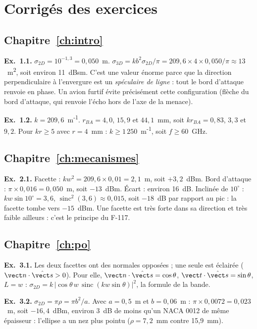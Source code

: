 \chapter{Corrigés des exercices}\label{annexe:corriges}

\section*{Chapitre~\ref{ch:intro}}
\textbf{Ex.~1.1.} $\sigma_{2D}=10^{-1{,}3}=0{,}050$~m. $\sigma_{3D}=kb^2\sigma_{2D}/\pi=209{,}6\times4\times0{,}050/\pi\approx13$~m\textsuperscript{2}, soit environ 11~dBsm. C'est une valeur énorme parce que la direction perpendiculaire à l'envergure est un \emph{spéculaire de ligne} : tout le bord d'attaque renvoie en phase. Un avion furtif évite précisément cette configuration (flèche du bord d'attaque, qui renvoie l'écho hors de l'axe de la menace).

\textbf{Ex.~1.2.} $k=209{,}6$~m\textsuperscript{-1}. $r_{BA}=4{,}0$, $15{,}9$ et $44{,}1$~mm, soit $kr_{BA}=0{,}83$, $3{,}3$ et $9{,}2$. Pour $kr\ge5$ avec $r=4$~mm : $k\ge1\,250$~m\textsuperscript{-1}, soit $f\ge60$~GHz.

\section*{Chapitre~\ref{ch:mecanismes}}
\textbf{Ex.~2.1.} Facette : $kw^2=209{,}6\times0{,}01=2{,}1$~m, soit $+3{,}2$~dBm. Bord d'attaque : $\pi\times0{,}016=0{,}050$~m, soit $-13$~dBm. Écart : environ 16~dB. Inclinée de $10^\circ$ : $kw\sin10^\circ=3{,}6$, $\operatorname{sinc}^2(3{,}6)\approx0{,}015$, soit $-18$~dB par rapport au pic : la facette tombe vers $-15$~dBm. Une facette est très forte dans sa direction et très faible ailleurs : c'est le principe du F-117.

\section*{Chapitre~\ref{ch:po}}
\textbf{Ex.~3.1.} Les deux facettes ont des normales opposées ; une seule est éclairée ($\vect n\cdot\shat>0$). Pour elle, $\vect n\cdot\shat=\cos\theta$, $\vect t\cdot\shat=\sin\theta$, $L=w$ : $\sigma_{2D}=k\,|\cos\theta\,w\,\operatorname{sinc}(kw\sin\theta)|^2$, la formule de la bande.

\textbf{Ex.~3.2.} $\sigma_{2D}=\pi\rho=\pi b^2/a$. Avec $a=0{,}5$~m et $b=0{,}06$~m : $\pi\times0{,}0072=0{,}023$~m, soit $-16{,}4$~dBm, environ 3~dB de moins qu'un NACA 0012 de même épaisseur : l'ellipse a un nez plus pointu ($\rho=7{,}2$~mm contre 15,9~mm).

